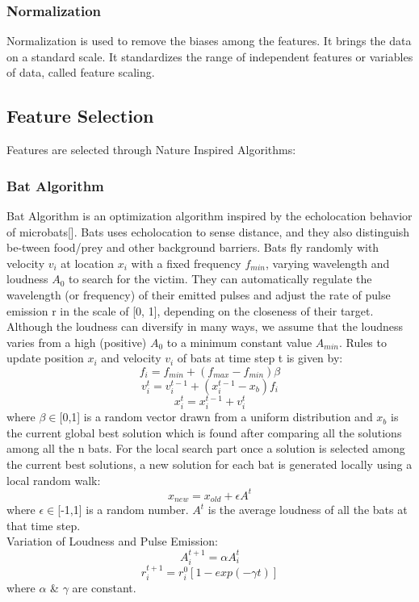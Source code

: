 \documentclass[12pt,a4paper]{article}
\begin{document}
\subsubsection{Normalization}
Normalization is used to remove the biases among the features.   It brings the data on a standard scale.  It standardizes the range of independent features or variables of data, called feature scaling.

\subsection{Feature Selection}
Features are selected through Nature Inspired Algorithms:
\subsubsection{Bat Algorithm}
Bat Algorithm is an optimization algorithm inspired by the echolocation behavior of microbats[].  Bats uses echolocation to sense distance, and they also distinguish be-tween food/prey and other background barriers.  Bats fly randomly with velocity $v_i$ at location $x_i$ with a fixed frequency $f_{min}$, varying wavelength and loudness $A_0$ to search for the victim.  They can automatically regulate the wavelength (or frequency) of their emitted pulses and adjust the rate of pulse emission r in the scale of [0, 1], depending on the closeness of their target. Although  the  loudness  can  diversify  in  many  ways,  we  assume  that  the  loudness  varies  from  a high (positive) $A_0$ to a minimum constant value $A_{min}$.
Rules to update position $x_i$ and velocity $v_i$ of bats at time step t is given by:
\begin{equation}
    f_i = f_{min} + (f_{max}-f_{min})\beta
\end{equation}
\begin{equation}
    v^t_i = v^{t-1}_i+(x^{t-1}_i-x_b)f_i
\end{equation}
\begin{equation}
    x^t_i = x^{t-1}_i+v^t_i
\end{equation}
where $\beta\in$[0,1]  is  a  random  vector  drawn  from  a  uniform  distribution and $x_{b}$ is the current global best solution  which is found after comparing all the solutions among all  the n bats.
For the local search part once a solution is selected among the current best solutions, a new solution for each bat is generated locally using a local random walk:
\begin{equation}
    x_{new} = x_{old} + \epsilon A^t
\end{equation}
where $\epsilon \in$[-1,1] is a random number. $A^t$ is the average loudness of all the bats at that time step.\\
Variation of Loudness and Pulse Emission:
\begin{equation}
    A^{t+1}_i = \alpha A^t_i
\end{equation}
\begin{equation}
    r^{t+1}_i = r^0_i [1-exp(-\gamma t)]
\end{equation}
where $\alpha$ \& $\gamma$  are constant.
\end{document}
